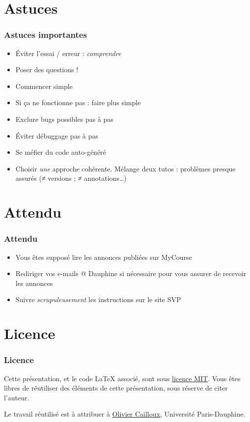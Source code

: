 \documentclass[english, french]{beamer}
\begin{document}
\section{Astuces}
\begin{frame}
	\frametitle{Astuces importantes}
	\begin{itemize}
		\item Éviter l’essai / erreur : \emph{comprendre}
		\item Poser des questions !
		\item Commencer simple
		\item Si ça ne fonctionne pas : faire plus simple
		\item Exclure bugs possibles pas à pas
		\item Éviter débuggage pas à pas
		\item Se méfier du code auto-généré
		\item Choisir \emph{une} approche cohérente. Mélange deux tutos : problèmes presque assurés ({}≠ versions ; ≠ annotations…)
	\end{itemize}
\end{frame}

\section{Attendu}
\begin{frame}
	\frametitle{Attendu}
	\begin{itemize}
		\item Vous êtes supposé lire les annonces publiées sur MyCourse
		\item Rediriger vos e-mails @ Dauphine si nécessaire pour vous assurer de recevoir les annonces
		\item Suivre \emph{scrupuleusement} les instructions sur le site SVP
	\end{itemize}
\end{frame}

\appendix
\section{Licence}
\begin{frame}
	\frametitle{Licence}
	Cette présentation, et le code LaTeX associé, sont sous \href{http://opensource.org/licenses/MIT}{licence MIT}. Vous êtes libres de réutiliser des éléments de cette présentation, sous réserve de citer l’auteur.
	
	Le travail réutilisé est à attribuer à \href{http://www.lamsade.dauphine.fr/~ocailloux/}{Olivier Cailloux}, Université Paris-Dauphine.
\end{frame}
\end{document}
